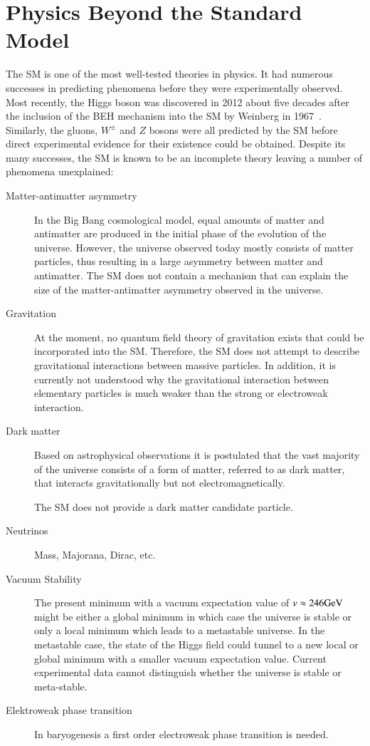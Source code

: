 \section{Physics Beyond the Standard Model}

The SM is one of the most well-tested theories in physics. It had numerous
successes in predicting phenomena before they were experimentally observed. Most
recently, the Higgs boson was discovered in 2012 about five decades after the
inclusion of the BEH mechanism into the SM by Weinberg in
1967~\cite{Weinberg:1967tq}. Similarly, the gluons, $W^\pm$ and $Z$ bosons were
all predicted by the SM before direct experimental evidence for their existence
could be obtained. Despite its many successes, the SM is known to be an
incomplete theory leaving a number of phenomena unexplained:
\begin{description}

\item[Matter-antimatter asymmetry] In the Big Bang cosmological model, equal
  amounts of matter and antimatter are produced in the initial phase of the
  evolution of the universe. However, the universe observed today mostly
  consists of matter particles, thus resulting in a large asymmetry between
  matter and antimatter. The SM does not contain a mechanism that can explain
  the size of the matter-antimatter asymmetry observed in the universe.

\item[Gravitation] At the moment, no quantum field theory of gravitation exists
  that could be incorporated into the SM. Therefore, the SM does not attempt to
  describe gravitational interactions between massive particles. In addition, it
  is currently not understood why the gravitational interaction between
  elementary particles is much weaker than the strong or electroweak
  interaction.

\item[Dark matter] Based on astrophysical observations it is postulated that the
  vast majority of the universe consists of a form of matter, referred to as
  dark matter, that interacts gravitationally but not electromagnetically.

  The SM does not provide a dark matter candidate particle.

\item[]

\item[Neutrinos] Mass, Majorana, Dirac, etc.

\item[Vacuum Stability] The present minimum with a vacuum expectation
  value of $v \approx \si{246}{\ensuremath{\text{GeV}}}$ might be either a global minimum
  in which case the universe is stable or only a local minimum which
  leads to a metastable universe. In the metastable case, the state of
  the Higgs field could tunnel to a new local or global minimum with a
  smaller vacuum expectation value. Current experimental data cannot
  distinguish whether the universe is stable or
  meta-stable.

\item[Elektroweak phase transition] In baryogenesis a first order
  electroweak phase transition is needed.

\end{description}
